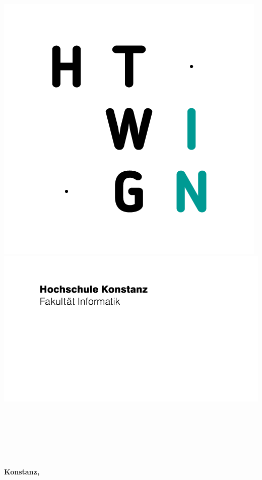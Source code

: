 \begin{titlepage}

\vspace*{-3.5cm}

\begin{flushleft}
\hspace*{-1cm} \includegraphics{media/HTWG_IN_Submarke/HTWG_IN_Submarke/_deutsch/_standard/_positiv/PNG/HTWG_IN_Modul_Zeichen_pos_2C.png}
\hspace{\fill}
\includegraphics{media/HTWG_IN_Submarke/HTWG_IN_Submarke/_deutsch/_standard/_positiv/PNG/HTWG_IN_Modul_Zusatz_pos_1C.png}
\end{flushleft}
\vspace{1cm}

\begin{center}
	\large{
		\textbf{\strLecture} \\[2cm]
	}
	\Huge{
		\textbf{\strTopic} \\[2cm]
	}
	\Large{
		\textbf{\strAuthorOne} \\
		\textbf{\strAuthorTwo}} \\[3cm]
	\large{
		\textbf{} \\[2.3cm]
	}
	
	\large{
		\textbf{Konstanz, \strDate}
	}
\end{center}
\end{titlepage}
\thispagestyle{empty}